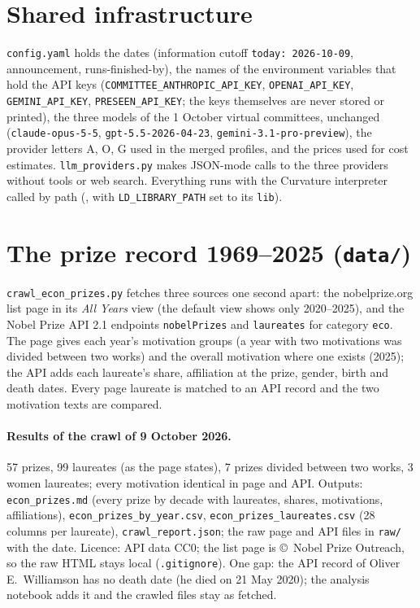 \documentclass[11pt,a4paper]{article}
\newcommand{\code}[1]{\texttt{#1}}
\begin{document}
\section{Shared infrastructure}

\begin{sloppypar}
\code{config.yaml} holds the dates (information cutoff \code{today: 2026-10-09}, announcement, runs-finished-by),
the names of the environment variables that hold the API keys (\code{COMMITTEE\_ANTHROPIC\_API\_KEY},
\code{OPENAI\_API\_KEY}, \code{GEMINI\_API\_KEY}, \code{PRESEEN\_API\_KEY}; the keys themselves are never stored or
printed), the three models of the 1 October virtual committees, unchanged (\code{claude-opus-5-5},
\code{gpt-5.5-2026-04-23}, \code{gemini-3.1-pro-preview}), the provider letters A, O, G used in the merged profiles,
and the prices used for cost estimates. \code{llm\_providers.py} makes JSON-mode calls to the three providers without
tools or web search. Everything runs with the Curvature interpreter called by path
(, with \code{LD\_LIBRARY\_PATH} set to its \code{lib}).
\end{sloppypar}

\section{The prize record 1969--2025 (\code{data/})}

\code{crawl\_econ\_prizes.py} fetches three sources one second apart: the nobelprize.org list page in its
\emph{All Years} view (the default view shows only 2020--2025), and the Nobel Prize API 2.1 endpoints
\code{nobelPrizes} and \code{laureates} for category \code{eco}. The page gives each year's motivation groups (a year
with two motivations was divided between two works) and the overall motivation where one exists (2025); the API adds
each laureate's share, affiliation at the prize, gender, birth and death dates. Every page laureate is matched to an
API record and the two motivation texts are compared.

\paragraph{Results of the crawl of 9 October 2026.} 57 prizes, 99 laureates (as the page states), 7 prizes divided
between two works, 3 women laureates; every motivation identical in page and API. Outputs: \code{econ\_prizes.md}
(every prize by decade with laureates, shares, motivations, affiliations), \code{econ\_prizes\_by\_year.csv},
\code{econ\_prizes\_laureates.csv} (28 columns per laureate), \code{crawl\_report.json}; the raw page and API files in
\code{raw/} with the date. Licence: API data CC0; the list page is \copyright~Nobel Prize Outreach, so the raw HTML
stays local (\code{.gitignore}). One gap: the API record of Oliver E.~Williamson has no death date (he died on
21 May 2020); the analysis notebook adds it and the crawled files stay as fetched.
\end{document}
